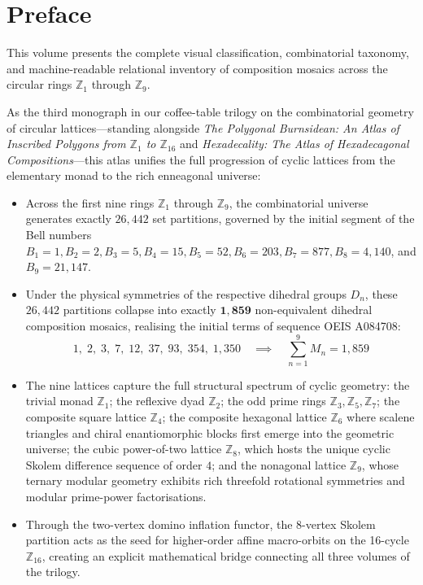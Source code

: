 \chapter*{Preface}

This volume presents the complete visual classification, combinatorial taxonomy, and machine-readable relational inventory of composition mosaics across the circular rings $\mathbb{Z}_1$ through $\mathbb{Z}_9$.

As the third monograph in our coffee-table trilogy on the combinatorial geometry of circular lattices---standing alongside \emph{The Polygonal Burnsidean: An Atlas of Inscribed Polygons from $\mathbb{Z}_1$ to $\mathbb{Z}_{16}$} and \emph{Hexadecality: The Atlas of Hexadecagonal Compositions}---this atlas unifies the full progression of cyclic lattices from the elementary monad to the rich enneagonal universe:
\begin{itemize}
    \item Across the first nine rings $\mathbb{Z}_1$ through $\mathbb{Z}_9$, the combinatorial universe generates exactly $26{,}442$ set partitions, governed by the initial segment of the Bell numbers $B_1 = 1, B_2 = 2, B_3 = 5, B_4 = 15, B_5 = 52, B_6 = 203, B_7 = 877, B_8 = 4{,}140$, and $B_9 = 21{,}147$.
    \item Under the physical symmetries of the respective dihedral groups $D_n$, these $26{,}442$ partitions collapse into exactly $\mathbf{1{,}859}$ non-equivalent dihedral composition mosaics, realising the initial terms of sequence OEIS A084708:
    \begin{equation*}
    1, \; 2, \; 3, \; 7, \; 12, \; 37, \; 93, \; 354, \; 1{,}350 \quad \implies \quad \sum_{n=1}^9 M_n = 1{,}859
    \end{equation*}
    \item The nine lattices capture the full structural spectrum of cyclic geometry: the trivial monad $\mathbb{Z}_1$; the reflexive dyad $\mathbb{Z}_2$; the odd prime rings $\mathbb{Z}_3, \mathbb{Z}_5, \mathbb{Z}_7$; the composite square lattice $\mathbb{Z}_4$; the composite hexagonal lattice $\mathbb{Z}_6$ where scalene triangles and chiral enantiomorphic blocks first emerge into the geometric universe; the cubic power-of-two lattice $\mathbb{Z}_8$, which hosts the unique cyclic Skolem difference sequence of order $4$; and the nonagonal lattice $\mathbb{Z}_9$, whose ternary modular geometry exhibits rich threefold rotational symmetries and modular prime-power factorisations.
    \item Through the two-vertex domino inflation functor, the 8-vertex Skolem partition acts as the seed for higher-order affine macro-orbits on the 16-cycle $\mathbb{Z}_{16}$, creating an explicit mathematical bridge connecting all three volumes of the trilogy.
\end{itemize}

